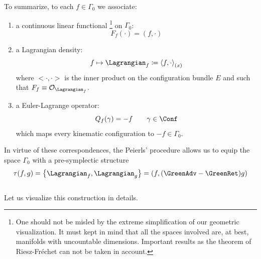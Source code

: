 \documentclass[Main]{subfiles}
\begin{document}
	To summarize, to each $f\in \Gamma_0$ we associate:
	\begin{enumerate}
		\item a continuous linear functional 
				\footnote{ One should not be misled by the extreme simplification of our geometric visualization.
				It must kept in mind that all the spaces involved are, at best, manifolds with uncountable dimensions.
				Important results as the theorem of Riesz-Fréchet can not be taken in account.}
			on $\Gamma_0$:
			\begin{displaymath}
				F_f(\cdot) = (f, \cdot)
			\end{displaymath}

		\item a Lagrangian density:
			\begin{displaymath}
				f \mapsto \Lagrangian_f \coloneqq \left\langle  f , \cdot \right\rangle_{(x)}
			\end{displaymath}
			where $<\cdot,\cdot>$ is the inner product on the configuration bundle $E$ and such that $F_f \equiv \mathcal{O}_{\Lagrangian_f}$.
		\item a Euler-Lagrange operator:
			\begin{displaymath}
				Q_{f}(\gamma) = - f \qquad \gamma \in \Conf
			\end{displaymath}
			which maps every kinematic configuration to $-f \in \Gamma_0$.
	\end{enumerate}
	In virtue of these correspondences, the Peierls' procedure allows us to equip the space $\Gamma_0$ with a pre-symplectic structure
	\begin{displaymath}
		\tau(f,g) =  \left\lbrace \Lagrangian_f , \Lagrangian_g \right\rbrace = \left( f, (\GreenAdv - \GreenRet) g \right)
	\end{displaymath}
	\vspace{2mm}\\
	Let us visualize this construction in details.
	
\end{document}
